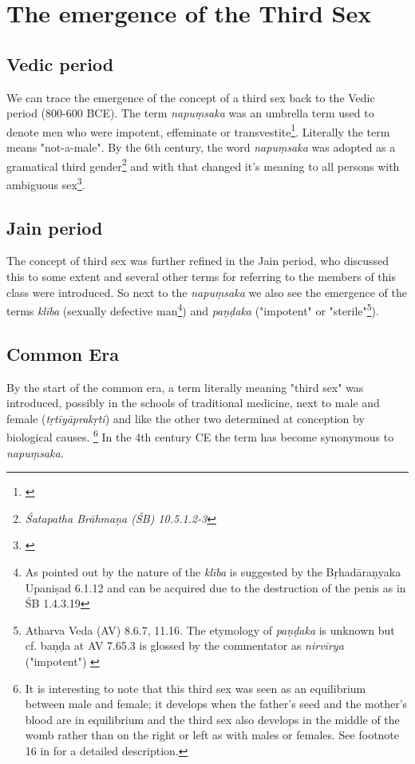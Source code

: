 \section{The emergence of the Third Sex}

\subsection{Vedic period}
We can trace the emergence of the concept of a third sex back to the Vedic period (800-600 BCE). The term {\em napuṃsaka} was an umbrella term used to denote men who were impotent, effeminate or transvestite\footnote{\cite{zwilling}}. Literally the term means "not-a-male". By the 6th century, the word {\em napuṃsaka} was adopted as a gramatical third gender\footnote{{\em Śatapatha Brāhmaṇa (ŚB) 10.5.1.2-3}} and with that changed it's meaning to all persons with ambiguous sex\footnote{\cite{zwilling2000}}. 

\subsection{Jain period}
The concept of third sex was further refined in the Jain period, who discussed this to some extent and several other terms for referring to the members of this class were introduced. So next to the {\em napuṃsaka} we also see the emergence of the terms {\em klība} (sexually defective man\footnote{As pointed out by \cite{zwilling} the nature of the {\em klība} is suggested by the Bṛhadāraṇyaka Upaniṣad 6.1.12 and can be acquired due to the destruction of the penis as in ŚB 1.4.3.19}) and {\em paṇḍaka} ("impotent" or "sterile"\footnote{Atharva Veda (AV) 8.6.7, 11.16. The etymology of {\em paṇḍaka} is unknown but cf. baṇḍa at AV 7.65.3 is glossed by the commentator as {\em nirvīrya} ("impotent") \cite{zwilling}}).

\subsection{Common Era}
By the start of the common era, a term literally meaning "third sex" was introduced, possibly in the schools of traditional medicine, next to male and female ({\em tṛtīyāprakṛti}) and like the other two determined at conception by biological causes. \footnote{It is interesting to note that this third sex was seen as an equilibrium between male and female; it develops when the father's seed and the mother's blood are in equilibrium and the third sex also develops in the middle of the womb rather than on the right or left as with males or females. See footnote 16 in \cite{zwilling} for a detailed description.} In the 4th century CE the term has become synonymous to {\em napuṃsaka}.

